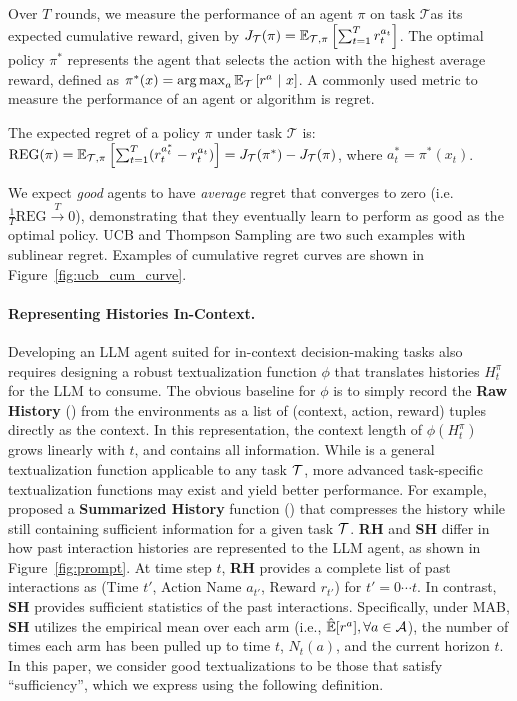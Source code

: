 Over $T$ rounds, we measure the performance of an agent $\pi$ on task $\mathcal{T} $as its expected cumulative reward, given by $J_{\mathcal{T}}(\pi) = \mathbb{E}_{\mathcal{T}, \pi} \left[\sum_{t =1}^T r_t^{a_t}\right]$. The optimal policy $\pi^*$ represents the agent that selects the action with the highest average reward, defined as $\pi^*(x) = \operatorname*{arg\,max}_a \mathbb{E}_{\mathcal T}\left[r^a \ | \ x \right]$. 
A commonly used metric to measure the performance of an agent or algorithm is regret.
\begin{defn}
The expected regret of a policy $\pi$ under task $\mathcal{T}$ is: $\text{REG}(\pi) = \mathbb{E}_{\mathcal{T}, \pi} \left[\sum_{t=1}^T (r_t^{a^*_t} - r_t^{a_t})  \right] = J_{\mathcal{T}}(\pi^*) - J_\mathcal{T}(\pi)$, where $a^*_t = \pi^*(x_t)$.
\end{defn} 
We expect \emph{good} agents to have \textit{average} regret that converges to zero (i.e. $\frac{1}{T}\text{REG} \stackrel{T}{\rightarrow} 0$), demonstrating that they eventually learn to perform as good as the optimal policy. UCB and Thompson Sampling are two such examples with sublinear regret. Examples of cumulative regret curves are shown in Figure~\ref{fig:ucb_cum_curve}. 

\paragraph{Representing Histories In-Context.}
Developing an LLM agent suited for in-context decision-making tasks also requires designing a robust textualization function $\phi$ that translates histories $H^\pi_t$ for the LLM to consume.
The obvious baseline for $\phi$ is to simply record the \textbf{Raw History} (\RH) from the environments as a list of (context, action, reward) tuples directly as the context. In this representation, the context length of $\phi(H_t^{\pi})$ grows linearly with $t$, and \RH contains all information. While \RH is a general textualization function applicable to any task ${\mathcal{T}}$, more advanced task-specific textualization functions may exist and yield better performance. For example, \cite{krishnamurthy2024can} proposed a \textbf{Summarized History} function (\SH)
that compresses the history while still containing sufficient information for a given task ${\mathcal{T}}$.
\textbf{RH} and \textbf{SH} differ in how past interaction histories are represented to the LLM agent, as shown in Figure~\ref{fig:prompt}. At time step $t$, \textbf{RH} provides a complete list of past interactions as (Time $t'$, Action Name $a_{t'}$, Reward $r_{t'}$) for $t'=0\cdots t$. In contrast, $\textbf{SH}$ provides sufficient statistics of the past interactions. Specifically, under MAB, \textbf{SH} utilizes the empirical mean over each arm (i.e., $\hat{\mathbb{E}}[r^{a}], \forall a \in {\mathcal{A}}$), the number of times each arm has been pulled up to time $t$, $N_t(a)$, and the current horizon $t$. 
In this paper, we consider good textualizations to be those that satisfy ``sufficiency'', which we express using the following definition. 

